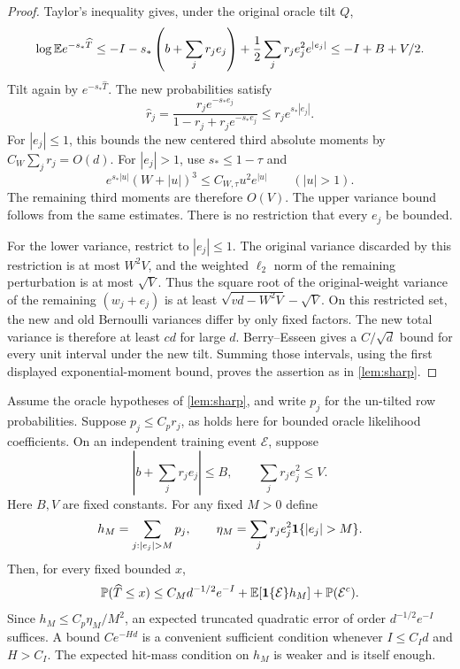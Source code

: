 \begin{proof}
Taylor's inequality gives, under the original oracle tilt $Q$,
\[
 \log\mathbb E e^{-s_*\widehat T}
 \le-I-s_*\left(b+\sum_jr_je_j\right)
       +\frac12\sum_jr_je_j^2e^{|e_j|}
 \le-I+B+V/2.
\]
Tilt again by $e^{-s_*\widehat T}$. The new probabilities satisfy
\[
 \widehat r_j
 =\frac{r_je^{-s_*e_j}}{1-r_j+r_je^{-s_*e_j}}
 \le r_je^{s_*|e_j|}.
\]
For $|e_j|\le1$, this bounds the new centered third absolute moments
by $C_W\sum_jr_j=O(d)$. For $|e_j|>1$, use $s_*\le1-\tau$ and
\[
 e^{s_*|u|}(W+|u|)^3
 \le C_{W,\tau}u^2e^{|u|}\qquad (|u|>1).
\]
The remaining third moments are therefore $O(V)$. The upper variance
bound follows from the same estimates. There is no restriction that
every $e_j$ be bounded.

For the lower variance, restrict to $|e_j|\le1$. The original variance
discarded by this restriction is at most $W^2V$, and the weighted
$\ell_2$ norm of the remaining perturbation is at most $\sqrt V$.
Thus the square root of the original-weight variance of the remaining
$(w_j+e_j)$ is at least $\sqrt{vd-W^2V}-\sqrt V$.
On this restricted set, the new and old Bernoulli variances differ by
only fixed factors. The new total variance is therefore at least $cd$
for large $d$. Berry--Esseen gives a $C/\sqrt d$ bound for every unit
interval under the new tilt. Summing those intervals, using the first
displayed exponential-moment bound, proves the assertion as in
\cref{lem:sharp}.
\end{proof}

\begin{lemma}
\label{lem:sparse-truncated-transfer}
Assume the oracle hypotheses of \cref{lem:sharp}, and write $p_j$
for the un-tilted row probabilities. Suppose $p_j\le C_pr_j$, as
holds here for bounded oracle likelihood coefficients. On an independent
training event $\mathcal E$, suppose
\[
 \left|b+\sum_jr_je_j\right|\le B,\qquad \sum_jr_je_j^2\le V.
\]
Here $B,V$ are fixed constants. For any fixed $M>0$ define
\[
 h_M=\sum_{j:|e_j|>M}p_j,\qquad
 \eta_M=\sum_jr_je_j^2\ind{|e_j|>M}.
\]
Then, for every fixed bounded $x$,
\begin{equation}\label{eq:sparse-truncated-transfer}
 \mathbb P(\widehat T\le x)
 \le C_Md^{-1/2}e^{-I}
       +\mathbb E[\mathbf1\{\mathcal E\}h_M]
       +\mathbb P(\mathcal E^c).
\end{equation}
Since $h_M\le C_p\eta_M/M^2$, an expected truncated quadratic error of order
$d^{-1/2}e^{-I}$ suffices. A bound $Ce^{-Hd}$ is a convenient
sufficient condition whenever $I\le C_Id$ and $H>C_I$.
The expected hit-mass condition on $h_M$ is weaker and is itself enough.
\end{lemma}

